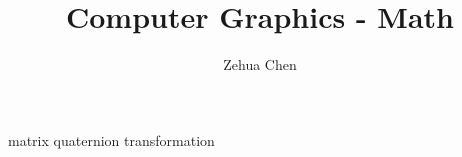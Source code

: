 \documentclass[letterpaper, 11pt]{report}
\title{Computer Graphics - Math}
\author{Zehua Chen}
\begin{document}
  \maketitle
  \tableofcontents

  {matrix}
  {quaternion}
  {transformation}
\end{document}
